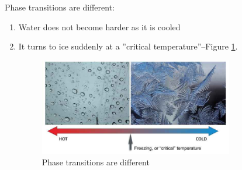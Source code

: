 \documentclass[]{article}
\begin{document}
 Phase transitions are different:
\begin{enumerate}
	\item Water does not become harder as it is cooled
	\item It turns to ice suddenly at a ''critical temperature''--Figure \ref{fig:water-ice}.

	\begin{figure}[H]
		\begin{center}
			\caption{Phase transitions are different}\label{fig:water-ice}
			\includegraphics[width=0.8\textwidth]{water-ice}
		\end{center}
	\end{figure}


\end{enumerate}
\end{document}
